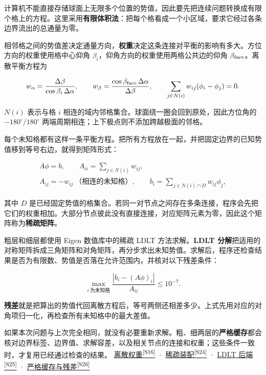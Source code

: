 \documentclass[11pt,a4paper]{article}
\numberwithin{equation}{topic}
\newcommand{\sourceref}[2]{\hyperlink{source-#1}{#2\textsuperscript{[#1]}}}
\begin{document}
计算机不能直接存储球面上无限多个位置的势值，因此要先把连续问题转换成有限个格上的方程。这里采用\textbf{有限体积法}：把每个格看成一个小区域，要求它经过各条边界流出的总通量为零。

相邻格之间的势值差决定通量方向，\textbf{权重}决定这条连接对平衡的影响有多大。方位方向的权重使用格中心仰角 \(\beta_i\)，仰角方向的权重使用两格公共边的仰角 \(\beta_{\rm face}\)。离散平衡方程为

\begin{equation}
\label{eq:flux}
w_\alpha=\frac{\Delta\beta}{\cos\beta_i\,\Delta\alpha},
\qquad
w_\beta=\frac{\cos\beta_{\rm face}\,\Delta\alpha}{\Delta\beta},
\qquad
\sum_{j\in N(i)}w_{ij}(\phi_i-\phi_j)=0.
\end{equation}

\(N(i)\) 表示与格 \(i\) 相连的域内邻格集合。球面绕一圈会回到原处，因此方位角的 \(-180^\circ/180^\circ\) 两端周期相连；上下极点则不添加跨越极面的邻格。

每个未知格都有这样一条平衡方程。把所有方程放在一起，并把固定边界的已知势值移到等号右边，就得到矩阵形式：

\begin{equation}
\label{eq:matrix}
\begin{gathered}
A\phi=b,\qquad
A_{ii}=\sum_{j\in N(i)}w_{ij},\\
A_{ij}=-w_{ij}\ \text{（相连的未知格）},\qquad
b_i=\sum_{j\in N(i)\cap D}w_{ij}\phi_j,
\end{gathered}
\end{equation}

其中 \(D\) 是已经固定势值的格集合。若同一对节点之间存在多条连接，程序会先把它们的权重相加。大部分节点彼此没有直接连接，对应矩阵元素为零，因此这个矩阵称为\textbf{稀疏矩阵}。

粗层和细层都使用 Eigen 数值库中的稀疏 LDLT 方法求解。\textbf{LDLT 分解}把适用的对称矩阵拆成三角矩阵和对角矩阵，再分步求出未知势值。求解后，程序还检查结果是否为有限数、势值是否落在允许范围内，并核对以下残差条件：

\begin{equation}
\label{eq:residual}
\max_{i\ \text{为未知格}}\frac{|b_i-(A\phi)_i|}{A_{ii}}\le 10^{-7}.
\end{equation}

\textbf{残差}就是把算出的势值代回离散方程后，等号两侧还相差多少。上式先用对应的对角项归一化，再检查所有未知格中的最大差值。

如果本次问题与上次完全相同，就没有必要重新求解。粗、细两层的\textbf{严格缓存}都会核对边界标签、边界值、求解容差，以及相关节点的连接和权重；这些条件一致时，才复用已经通过检查的结果。 \sourceref{S16}{离散权重} · \sourceref{S24}{稀疏装配} · \sourceref{S25}{LDLT 后端} · \sourceref{S26}{严格缓存与残差}
\end{document}
